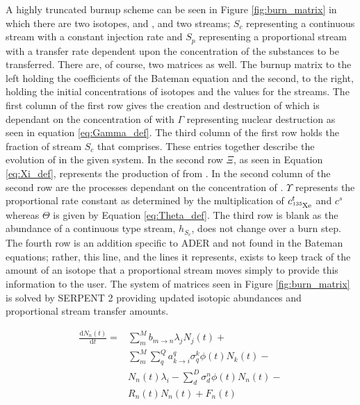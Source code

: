 A highly truncated burnup scheme can be
seen in Figure \ref{fig:burn_matrix} in which there are two isotopes,
 and , and two streams; $S_{c}$ representing a
continuous stream with a constant injection rate and $S_{p}$ representing a
proportional stream with a transfer rate dependent upon the concentration
of the substances to be transferred. There are, of course, two matrices as well.
The burnup matrix to the left holding the coefficients of the Bateman equation
and the second, to the right, holding the initial concentrations of isotopes
and the values for the streams. The first column of the first row gives
the creation and destruction of  which is dependant on the
concentration of  with $\Gamma$ representing nuclear destruction as
seen in equation \ref{eq:Gamma_def}. The third column of the first row holds
the fraction of stream $S_{c}$ that  comprises. These entries
together describe the evolution of  in the given system. In the
second row $\Xi$, as seen in Equation \ref{eq:Xi_def}, represents the production
of  from . In the second column of the second row are
the processes dependant on the concentration of . $\Upsilon$
represents the proportional rate constant as determined by the multiplication
of $c_{\ce{^{135}Xe}}^{t}$ and $c^{s}$ whereas $\Theta$ is given by Equation \ref{eq:Theta_def}. The third row is blank as the abundance of a continuous type
stream, $h_{S_{c}}$, does not change over a burn step. The fourth row is an
addition specific to ADER and not found in the Bateman equations; rather, this
line, and the lines it represents, exists to keep track of the amount of an
isotope that a proportional stream moves simply to provide this information
to the user. The system of matrices seen in Figure \ref{fig:burn_matrix} is
solved by SERPENT 2 providing updated isotopic abundances and proportional 
stream transfer amounts.

    \begin{equation}
    \label{eq:Bateman}
    \begin{split}
        \frac{\mathrm{d}N_{n}(t)}{\mathrm{d}t} = & \sum \limits_{m}^{M} 
        b_{m \rightarrow n} \lambda_{j} N_{j}(t) + \\
        & \sum \limits_{m}^{M}
        \sum \limits_{q}^{Q} a_{k \rightarrow i}^{q}
        \sigma_{q}^{k} \phi(t) N_{k}(t) - \\
        & N_{n}(t) \lambda_{i} - \sum \limits_{d}^{D}
        \sigma_{d}^{n} \phi(t) N_{n}(t) - \\
        & R_{n}(t) N_{n}(t) + F_{n}(t)
    \end{split}
    \end{equation}

